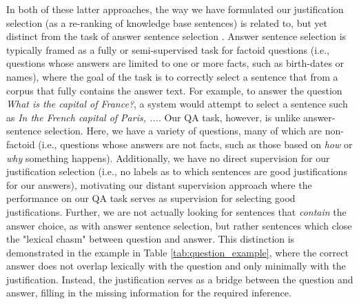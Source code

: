 In both of these latter approaches, the way we have formulated our justification selection (as a re-ranking of knowledge base sentences) is related to, but yet distinct from the task of answer sentence selection \cite[][inter alia]{Wang2010ProbabilisticTM, Severyn:12,Severyn:13a,Severyn:13b,Severyn2015LearningTR,wang2015long}.  Answer sentence selection is typically framed as a fully or semi-supervised task for factoid questions (i.e., questions whose answers are limited to one or more facts, such as birth-dates or names), where the goal of the task is to correctly select a sentence that from a corpus that fully contains the answer text.  For example, to answer the question \textit{What is the capital of France?}, a system would attempt to select a sentence such as \textit{In the French capital of Paris, ...}.
Our QA task, however, is unlike answer-sentence selection.  Here, we have a variety of questions, many of which are non-factoid (i.e., questions whose answers are not facts, such as those based on \textit{how} or \textit{why} something happens).  Additionally, we have no direct supervision for our justification selection (i.e., no labels as to which sentences are good justifications for our answers), motivating our distant supervision approach where the performance on our QA task serves as supervision for selecting good justifications.  Further, we are not actually looking for sentences that \emph{contain} the answer choice, as with answer sentence selection, but rather sentences which close the "lexical chasm" \citep{Berger:00} between question and answer.  This distinction is demonstrated in the example in Table \ref{tab:question_example}, where the correct answer does not overlap lexically with the question and only minimally with the justification.  Instead, the justification serves as a bridge between the question and answer, filling in the missing information for the required inference. 

